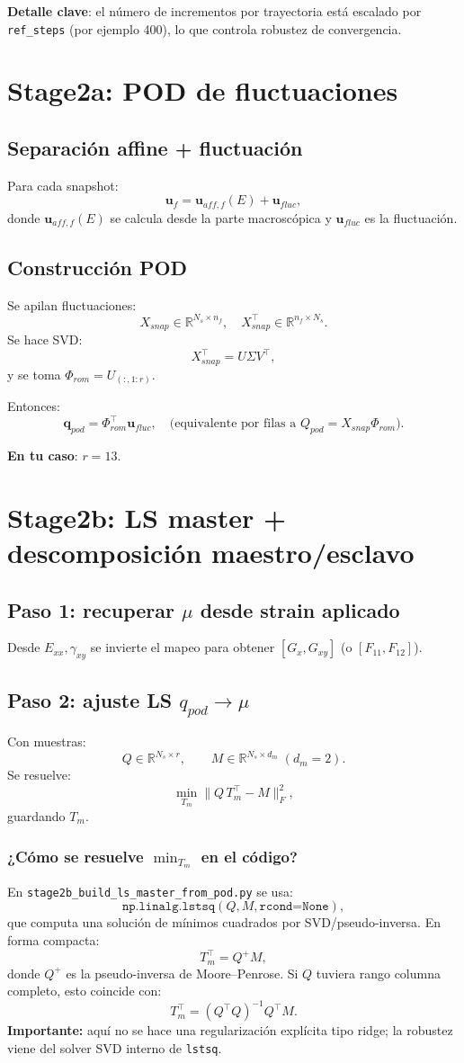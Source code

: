 \documentclass[11pt,a4paper]{article}
\begin{document}
\textbf{Detalle clave}: el número de incrementos por trayectoria está escalado por \texttt{ref\_steps} (por ejemplo 400), lo que controla robustez de convergencia.

\section{Stage2a: POD de fluctuaciones}
\subsection{Separación affine + fluctuación}
Para cada snapshot:
\[
\mathbf{u}_f = \mathbf{u}_{aff,f}(E) + \mathbf{u}_{fluc},
\]
donde $\mathbf{u}_{aff,f}(E)$ se calcula desde la parte macroscópica y
$\mathbf{u}_{fluc}$ es la fluctuación.

\subsection{Construcción POD}
Se apilan fluctuaciones:
\[
X_{snap} \in \mathbb{R}^{N_s \times n_f},\quad X_{snap}^\top\in\mathbb{R}^{n_f\times N_s}.
\]
Se hace SVD:
\[
X_{snap}^\top = U\Sigma V^\top,
\]
y se toma $\Phi_{rom}=U_{(:,1:r)}$.

Entonces:
\[
\mathbf{q}_{pod} = \Phi_{rom}^\top \mathbf{u}_{fluc},
\quad\text{(equivalente por filas a }Q_{pod}=X_{snap}\Phi_{rom}\text{)}.
\]

\textbf{En tu caso}: $r=13$.

\section{Stage2b: LS master + descomposición maestro/esclavo}
\subsection{Paso 1: recuperar $\mu$ desde strain aplicado}
Desde $E_{xx},\gamma_{xy}$ se invierte el mapeo para obtener
$[G_x,G_{xy}]$ (o $[F_{11},F_{12}]$).

\subsection{Paso 2: ajuste LS $q_{pod}\to \mu$}
Con muestras:
\[
Q\in\mathbb{R}^{N_s\times r},\qquad
M\in\mathbb{R}^{N_s\times d_m}\;(d_m=2).
\]
Se resuelve:
\[
\min_{T_m}\|Q\,T_m^\top - M\|_F^2,
\]
guardando $T_m$.

\subsubsection*{¿Cómo se resuelve \texorpdfstring{$\min_{T_m}$}{min Tm} en el código?}
En \texttt{stage2b\_build\_ls\_master\_from\_pod.py} se usa:
\[
\texttt{np.linalg.lstsq}(Q, M,\texttt{rcond=None}),
\]
que computa una solución de mínimos cuadrados por SVD/pseudo-inversa.
En forma compacta:
\[
T_m^\top = Q^+ M,
\]
donde $Q^+$ es la pseudo-inversa de Moore--Penrose.
Si $Q$ tuviera rango columna completo, esto coincide con:
\[
T_m^\top = (Q^\top Q)^{-1}Q^\top M.
\]
\textbf{Importante:} aquí no se hace una regularización explícita tipo ridge; la robustez viene del solver SVD interno de \texttt{lstsq}.
\end{document}
